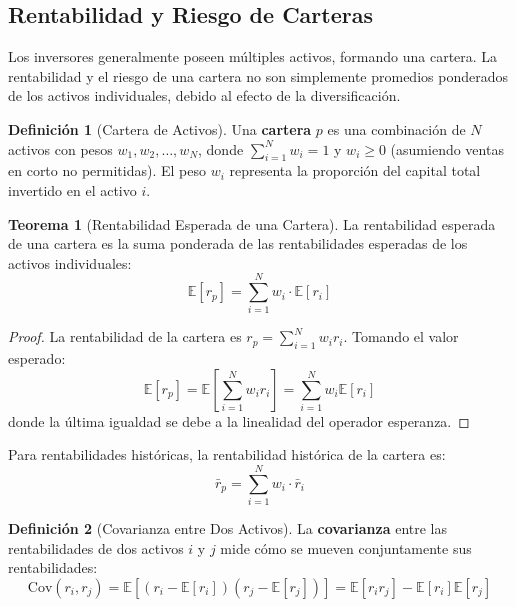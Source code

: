 \documentclass[12pt,a4paper]{article}
\theoremstyle{definition}
\newtheorem{definicion}{Definición}[section]
\newtheorem{teorema}{Teorema}[section]
\newcommand{\E}{\mathbb{E}}
\newcommand{\Cov}{\text{Cov}}
\begin{document}
\subsection{Rentabilidad y Riesgo de Carteras}

Los inversores generalmente poseen múltiples activos, formando una cartera. La rentabilidad y el riesgo de una cartera no son simplemente promedios ponderados de los activos individuales, debido al efecto de la diversificación.

\begin{definicion}[Cartera de Activos]
Una \textbf{cartera} $p$ es una combinación de $N$ activos con pesos $w_1, w_2, \ldots, w_N$, donde $\sum_{i=1}^{N} w_i = 1$ y $w_i \geq 0$ (asumiendo ventas en corto no permitidas). El peso $w_i$ representa la proporción del capital total invertido en el activo $i$.
\end{definicion}

\begin{teorema}[Rentabilidad Esperada de una Cartera]
La rentabilidad esperada de una cartera es la suma ponderada de las rentabilidades esperadas de los activos individuales:
\begin{equation}
\E[r_p] = \sum_{i=1}^{N} w_i \cdot \E[r_i]
\end{equation}
\end{teorema}

\begin{proof}
La rentabilidad de la cartera es $r_p = \sum_{i=1}^{N} w_i r_i$. Tomando el valor esperado:
$$\E[r_p] = \E\left[\sum_{i=1}^{N} w_i r_i\right] = \sum_{i=1}^{N} w_i \E[r_i]$$
donde la última igualdad se debe a la linealidad del operador esperanza.
\end{proof}

Para rentabilidades históricas, la rentabilidad histórica de la cartera es:
\begin{equation}
\bar{r}_p = \sum_{i=1}^{N} w_i \cdot \bar{r}_i
\end{equation}

\begin{definicion}[Covarianza entre Dos Activos]
La \textbf{covarianza} entre las rentabilidades de dos activos $i$ y $j$ mide cómo se mueven conjuntamente sus rentabilidades:
\begin{equation}
\Cov(r_i, r_j) = \E[(r_i - \E[r_i])(r_j - \E[r_j])] = \E[r_i r_j] - \E[r_i]\E[r_j]
\end{equation}
\end{definicion}
\end{document}
